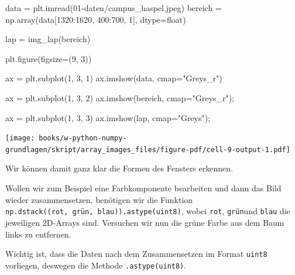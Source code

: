 \documentclass[
  letterpaper,
  DIV=11,
  numbers=noendperiod]{scrreprt}
\newenvironment{Shaded}{\begin{snugshade}}{\end{snugshade}}
\newcommand{\BuiltInTok}[1]{\textcolor[rgb]{0.00,0.23,0.31}{#1}}
\newcommand{\DecValTok}[1]{\textcolor[rgb]{0.68,0.00,0.00}{#1}}
\newcommand{\NormalTok}[1]{\textcolor[rgb]{0.00,0.23,0.31}{#1}}
\newcommand{\OperatorTok}[1]{\textcolor[rgb]{0.37,0.37,0.37}{#1}}
\newcommand{\StringTok}[1]{\textcolor[rgb]{0.13,0.47,0.30}{#1}}
\begin{document}
\begin{Shaded}
\begin{Highlighting}[]
\NormalTok{data }\OperatorTok{=}\NormalTok{ plt.imread(}\StringTok{\textquotesingle{}01{-}daten/campus\_haspel.jpeg\textquotesingle{}}\NormalTok{)}
\NormalTok{bereich }\OperatorTok{=}\NormalTok{ np.array(data[}\DecValTok{1320}\NormalTok{:}\DecValTok{1620}\NormalTok{, }\DecValTok{400}\NormalTok{:}\DecValTok{700}\NormalTok{, }\DecValTok{1}\NormalTok{], dtype}\OperatorTok{=}\BuiltInTok{float}\NormalTok{)}

\NormalTok{lap }\OperatorTok{=}\NormalTok{ img\_lap(bereich)}

\NormalTok{plt.figure(figsize}\OperatorTok{=}\NormalTok{(}\DecValTok{9}\NormalTok{, }\DecValTok{3}\NormalTok{))}

\NormalTok{ax }\OperatorTok{=}\NormalTok{ plt.subplot(}\DecValTok{1}\NormalTok{, }\DecValTok{3}\NormalTok{, }\DecValTok{1}\NormalTok{)}
\NormalTok{ax.imshow(data, cmap}\OperatorTok{=}\StringTok{"Greys\_r"}\NormalTok{)}

\NormalTok{ax }\OperatorTok{=}\NormalTok{ plt.subplot(}\DecValTok{1}\NormalTok{, }\DecValTok{3}\NormalTok{, }\DecValTok{2}\NormalTok{)}
\NormalTok{ax.imshow(bereich, cmap}\OperatorTok{=}\StringTok{"Greys\_r"}\NormalTok{)}\OperatorTok{;}

\NormalTok{ax }\OperatorTok{=}\NormalTok{ plt.subplot(}\DecValTok{1}\NormalTok{, }\DecValTok{3}\NormalTok{, }\DecValTok{3}\NormalTok{)}
\NormalTok{ax.imshow(lap, cmap}\OperatorTok{=}\StringTok{"Greys"}\NormalTok{)}\OperatorTok{;}
\end{Highlighting}
\end{Shaded}

\texttt{[image: books/w-python-numpy-grundlagen/skript/array\_images\_files/figure-pdf/cell-9-output-1.pdf]}

Wir können damit ganz klar die Formen des Fensters erkennen.

Wollen wir zum Beispiel eine Farbkomponente bearbeiten und dann das Bild
wieder zusammensetzen, benötigen wir die Funktion
\texttt{np.dstack((rot,\ grün,\ blau)).astype(\textquotesingle{}uint8\textquotesingle{})},
wobei \texttt{rot}, \texttt{grün}und \texttt{blau} die jeweiligen
2D-Arrays sind. Versuchen wir nun die grüne Farbe aus dem Baum links zu
entfernen.

Wichtig ist, dass die Daten nach dem Zusammensetzen im Format
\texttt{uint8} vorliegen, deswegen die Methode
\texttt{.astype(\textquotesingle{}uint8\textquotesingle{})}.
\end{document}
